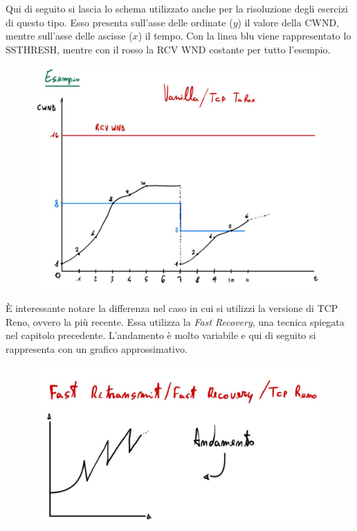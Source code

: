 \documentclass[a4paper]{article}
\begin{document}
	\noindent
	Qui di seguito si lascia lo schema utilizzato anche per la risoluzione degli esercizi di questo tipo. Esso presenta sull’asse delle ordinate ($y$) il valore della \textsf{CWND}, mentre sull’asse delle ascisse ($x$) il tempo. Con la linea blu viene rappresentato lo \textsf{SSTHRESH}, mentre con il rosso la \textsf{RCV WND} costante per tutto l’esempio.
	\begin{figure}[!htp]
		\centering
		\includegraphics[width=\textwidth]{img/congestione_eg_esercizio.pdf}
	\end{figure}
	
	\noindent
	È interessante notare la differenza nel caso in cui si utilizzi la versione di TCP Reno, ovvero la più recente. Essa utilizza la \emph{Fast Recovery}, una tecnica spiegata nel capitolo precedente. L’andamento è molto variabile e qui di seguito si rappresenta con un grafico approssimativo.
	\begin{figure}[!htp]
		\centering
		\includegraphics[width=.8\textwidth]{img/andamento.pdf}
	\end{figure}\newpage
\end{document}
